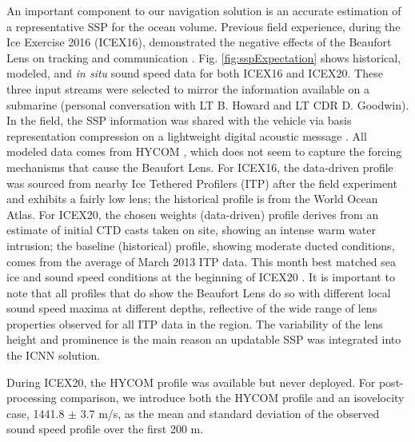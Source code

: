 An important component to our navigation solution is an accurate estimation of a representative SSP for the ocean volume.
Previous field experience, during the Ice Exercise 2016 (ICEX16), demonstrated the negative effects of the Beaufort Lens on tracking and communication \citep{Schmidt2016}.
Fig. \ref{fig:sspExpectation} shows historical, modeled, and \textit{in situ} sound speed data for both ICEX16 and ICEX20.
These three input streams were selected to mirror the information available on a submarine (personal conversation with LT B. Howard and LT CDR D. Goodwin). 
In the field, the SSP information was shared with the vehicle via basis representation compression on a lightweight digital acoustic message \citep{bhatt_embedded_2022}. 
All modeled data comes from HYCOM \cite{Chassignet2007}, which does not seem to capture the forcing mechanisms that cause the Beaufort Lens.
For ICEX16, the data-driven profile was sourced from nearby Ice Tethered Profilers (ITP) after the field experiment \cite{Krishfield2008,Toole2011} and exhibits a fairly low lens; the historical profile is from the World Ocean Atlas.
For ICEX20, the chosen weights (data-driven) profile derives from an estimate of initial CTD casts taken on site, showing an intense warm water intrusion; the baseline (historical) profile, showing moderate ducted conditions, comes from the average of March 2013 ITP data.
This month best matched sea ice and sound speed conditions at the beginning of ICEX20 \citep{bhatt_embedded_2022}.
It is important to note that all profiles that do show the Beaufort Lens do so with different local sound speed maxima at different depths, reflective of the wide range of lens properties observed for all ITP data in the region. 
The variability of the lens height and prominence is the main reason an updatable SSP was integrated into the ICNN solution.

During ICEX20, the HYCOM profile was available but never deployed. 
For post-processing comparison, we introduce both the HYCOM profile and an isovelocity case, 1441.8 $\pm$ 3.7 m/s, as the mean and standard deviation of the observed sound speed profile over the first 200 m.

